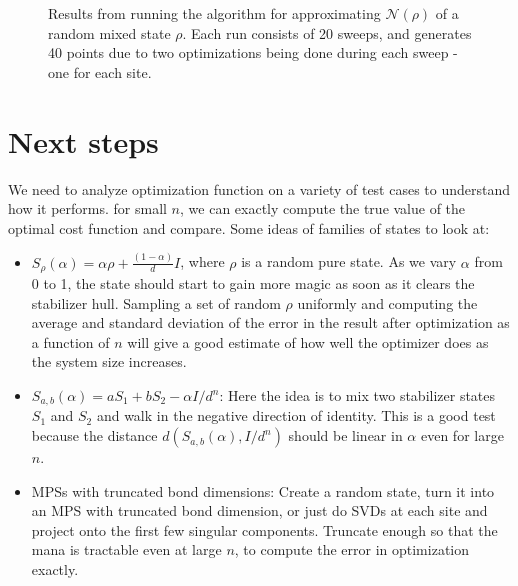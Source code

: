 \documentclass{article}
\begin{document}
\begin{figure}[H]
\centering
{}
\caption{Results from running the algorithm for approximating $\mathcal N(\rho)$ of a random mixed state $\rho$. Each run consists of 20 sweeps, and generates 40 points due to two optimizations being done during each sweep - one for each site.}
\end{figure}

\section{Next steps}

We need to analyze optimization function on a variety of test cases to understand how it performs. for small $n$, we can exactly compute the true value of the optimal cost function and compare. Some ideas of families of states to look at:
\begin{itemize}
\item $S_\rho(\alpha)=\alpha\rho+\frac{(1-\alpha)}{d}I$, where $\rho$ is a random pure state. As we vary $\alpha$ from 0 to 1, the state should start to gain more magic as soon as it clears the stabilizer hull. Sampling a set of random $\rho$ uniformly and computing the average and standard deviation of the error in the result after optimization as a function of $n$ will give a good estimate of how well the optimizer does as the system size increases. 
\item $S_{a,b}(\alpha)=aS_1+bS_2-\alpha I/d^n$: Here the idea is to mix two stabilizer states  $S_1$ and $S_2$ and walk in the negative direction of identity.  This is a good test because the distance $d(S_{a,b}(\alpha),I/d^n)$ should be linear in $\alpha$ even for large $n$.
\item MPSs with truncated bond dimensions: Create a random state, turn it into an MPS with truncated bond dimension, or just do SVDs at each site and project onto the first few singular components. Truncate enough so that the mana is tractable even at large $n$, to compute the error in optimization exactly.
\end{itemize}
\end{document}
